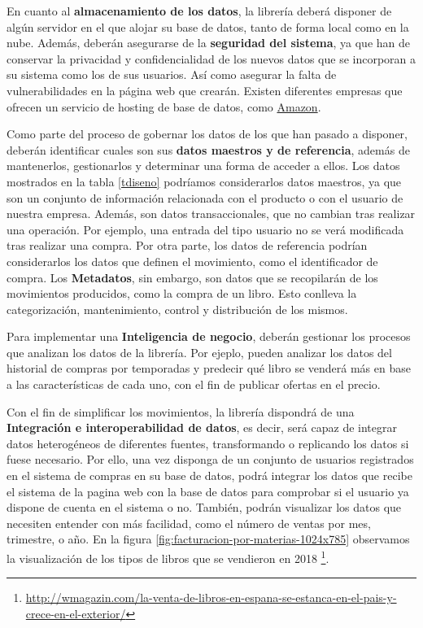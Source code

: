 \documentclass{article}
\begin{document}
En cuanto al \textbf{almacenamiento de los datos}, la librería deberá disponer de algún servidor en el que alojar su base de datos, tanto de forma local como en la nube. Además, deberán asegurarse de la \textbf{seguridad del sistema}, ya que han de conservar la privacidad y confidencialidad de los nuevos datos que se incorporan a su sistema como los de sus usuarios. Así como asegurar la falta de vulnerabilidades en la página web que crearán.
Existen diferentes empresas que ofrecen un servicio de hosting de base de datos, como \href{https://aws.amazon.com/es/products/databases/}{Amazon}.

Como parte del proceso de gobernar los datos de los que han pasado a disponer, deberán identificar cuales son sus \textbf{datos maestros y de referencia}, además de mantenerlos, gestionarlos y determinar una forma de acceder a ellos. Los datos mostrados en la tabla \ref{tdiseno} podríamos considerarlos datos maestros, ya que son un conjunto de información relacionada con el producto o con el usuario de nuestra empresa. Además, son datos transaccionales, que no cambian tras realizar una operación. Por ejemplo, una entrada del tipo usuario no se verá modificada tras realizar una compra. Por otra parte, los datos de referencia podrían considerarlos los datos que definen el movimiento, como el identificador de compra. 
Los \textbf{Metadatos}, sin embargo, son datos que se recopilarán de los movimientos producidos, como la compra de un libro. Esto conlleva la categorización, mantenimiento, control y distribución de los mismos.

Para implementar una \textbf{Inteligencia de negocio}, deberán gestionar los procesos que analizan los datos de la librería. Por ejeplo, pueden analizar los datos del historial de compras por temporadas y predecir qué libro se venderá más en base a las características de cada uno, con el fin de publicar ofertas en el precio.

Con el fin de simplificar los movimientos, la librería dispondrá de una \textbf{Integración e interoperabilidad de datos}, es decir, será capaz de integrar datos heterogéneos de diferentes fuentes, transformando o replicando los datos si fuese necesario. Por ello, una vez disponga de un conjunto de usuarios registrados en el sistema de compras en su base de datos, podrá integrar los datos que recibe el sistema de la pagina web con la base de datos para comprobar si el usuario ya dispone de cuenta en el sistema o no. También, podrán visualizar los datos que necesiten entender con más facilidad, como el número de ventas por mes, trimestre, o año. En la figura \ref{fig:facturacion-por-materias-1024x785} observamos la visualización de los tipos de libros que se vendieron en 2018 \footnote{\url{http://wmagazin.com/la-venta-de-libros-en-espana-se-estanca-en-el-pais-y-crece-en-el-exterior/}}.
\end{document}
